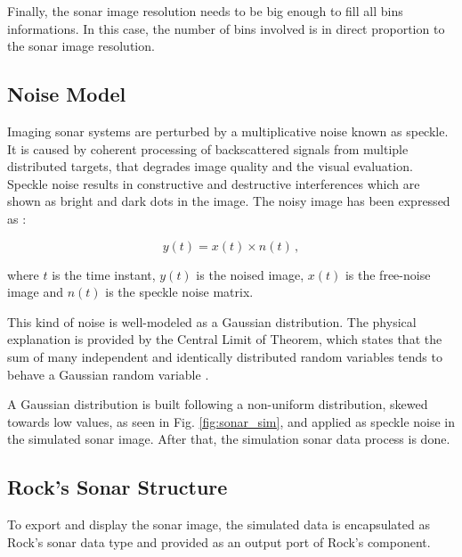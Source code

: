 \documentclass[final,5p,times]{elsarticle}
\begin{document}
Finally, the sonar image resolution needs to be big enough to fill all bins informations. In this case, the number of bins involved is in direct proportion to the sonar image resolution.


\subsection{Noise Model}
\label{dev:noise}

Imaging sonar systems are perturbed by a multiplicative noise known as speckle. It is caused by coherent processing of backscattered signals from multiple distributed targets, that degrades image quality and the visual evaluation. Speckle noise results in constructive and destructive interferences which are shown as bright and dark dots in the image. The noisy image has been expressed as \cite{lee1980}:

\begin{equation}
\label{eq:2}
y(t) = x(t) \times n(t) \, ,
\end{equation}

where $t$ is the time instant, $y(t)$ is the noised image, $x(t)$ is the free-noise image and $n(t)$ is the speckle noise matrix.

This kind of noise is well-modeled as a Gaussian distribution. The physical explanation is provided by the Central Limit of Theorem, which states that the sum of many independent and identically distributed random variables tends to behave a Gaussian random variable \cite{papoulis2002}.

A Gaussian distribution is built following a non-uniform distribution, skewed towards low values, as seen in Fig. \ref{fig:sonar_sim}, and applied as speckle noise in the simulated sonar image. After that, the simulation sonar data process is done.

\subsection{Rock's Sonar Structure}
\label{dev:rock}

To export and display the sonar image, the simulated data is encapsulated as Rock's sonar data type and provided as an output port of Rock's component.

\end{document}
